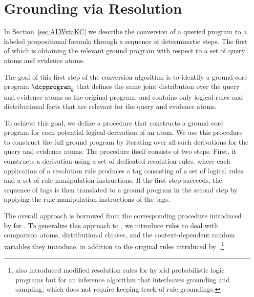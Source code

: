 \section{Grounding via Resolution}
\label{app:resolution}

In Section~\ref{sec:ALWviaKC} we describe the conversion of a queried \dcproblogsty program to a labeled propositional formula through a sequence of deterministic steps. The first of which is obtaining the relevant ground program with respect to a set of query atoms and evidence atoms.

The goal of this first step of the conversion algorithm is to identify a ground core \dcproblogsty program $\dcpprogram_g$ that defines the same joint distribution over the query and evidence atoms as the original program, and contains only logical rules and distributional facts that are relevant for the query and evidence atoms. 

To achieve this goal, we define a procedure that constructs a ground core program for each potential logical derivation of an atom. We use this procedure to construct the full ground program by iterating over all such derivations for the query and evidence atoms. The procedure itself consists of two steps. First, it constructs a derivation using a set of dedicated resolution rules, where each application of a resolution rule produces a tag consisting of a set of logical rules and a set of rule manipulation instructions. If the first step succeeds, the sequence of tags is then translated to a ground program in the second step by applying the rule manipulation instructions of the tags.

The overall approach 
is borrowed from the corresponding procedure introduced by \citet{fierens2015inference} for \problogsty. To generalize this approach to \dcproblogsty, we introduce rules to deal with comparison atoms, distributional clauses, and the context-dependent random variables they introduce, in addition to the original rules intriduced by~\citet{fierens2015inference}.\footnote{\citet{nitti2016probabilistic} also introduced modified resolution rules for hybrid probabilistic logic programs but for an inference algorithm that interleaves grounding and sampling, which does not require keeping track of rule groundings.}


